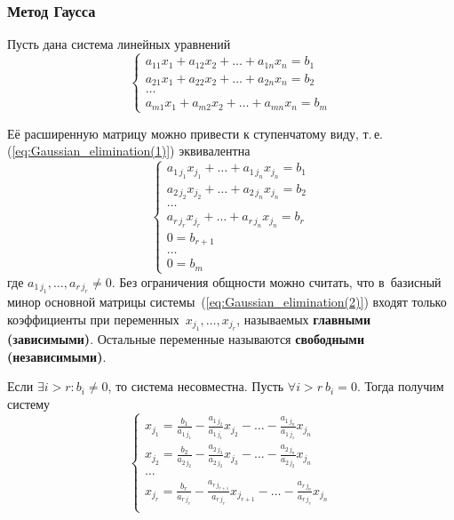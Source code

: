 \subsubsection{Метод Гаусса}
Пусть дана система линейных уравнений
\begin{equation}
\label{eq:Gaussian_elimination(1)}
\begin{cases}
a_{11} x_1 + a_{12} x_2 + \dots + a_{1n} x_n = b_1 \\
a_{21} x_1 + a_{22} x_2 + \dots + a_{2n} x_n = b_2 \\
\ldots \\
a_{m1} x_1 + a_{m2} x_2 + \dots + a_{mn} x_n = b_m
\end{cases}
\end{equation}

Её расширенную матрицу можно привести к ступенчатому виду, т.\,е. (\ref*{eq:Gaussian_elimination(1)}) эквивалентна
\begin{equation}
\label{eq:Gaussian_elimination(2)}
\begin{cases}
a_{1\, j_1} x_{j_1} + \ldots + a_{1\, j_n} x_{j_n} = b_1 \\
a_{2\, j_2} x_{j_2} + \ldots + a_{2\, j_n} x_{j_n} = b_2 \\
\ldots \\
a_{r\, j_r} x_{j_r} + \ldots + a_{r\, j_n} x_{j_n} = b_r \\
0 = b_{r+1} \\
\ldots \\
0 = b_m
\end{cases}
\end{equation}
где $a_{1\, j_1}, \ldots, a_{r\, j_r} \neq 0$.
Без ограничения общности можно считать, что в~базисный минор основной матрицы системы~(\ref*{eq:Gaussian_elimination(2)}) входят только коэффициенты при переменных~$x_{j_1}, \ldots, x_{j_r}$, называемых \textbf{главными (зависимыми)}.
Остальные переменные называются \textbf{свободными (независимыми)}.

Если $\exists i > r \colon b_i \neq 0$, то система несовместна.
Пусть $\forall i > r \ b_i = 0$. Тогда получим систему
\begin{equation*}
\begin{cases}
\displaystyle x_{j_1} = \frac{b_1}{a_{1\, j_1}} - \frac{a_{1\, j_2}}{a_{1\, j_1}} x_{j_2} - \ldots - \frac{a_{1\, j_n}}{a_{1\, j_1}} x_{j_n} \\
\displaystyle x_{j_2} = \frac{b_2}{a_{2\, j_2}} - \frac{a_{2\, j_3}}{a_{2\, j_2}} x_{j_3} - \ldots - \frac{a_{2\, j_n}}{a_{2\, j_2}} x_{j_n} \\
\ldots \\
\displaystyle x_{j_r} = \frac{b_r}{a_{r\, j_r}} - \frac{a_{r\, j_{r+1}}}{a_{r\, j_r}} x_{j_{r+1}} - \ldots - \frac{a_{r\, j_n}}{a_{r\, j_r}} x_{j_n} \\
\end{cases}
\end{equation*}

